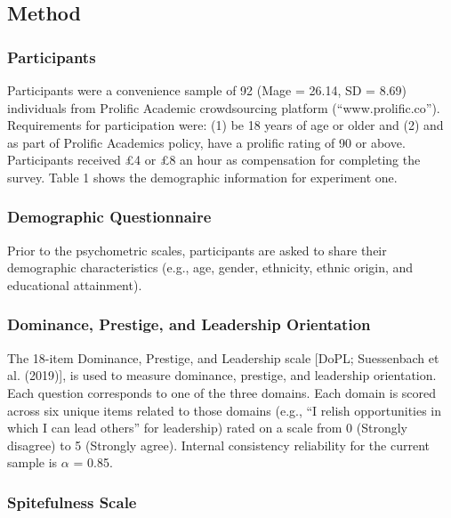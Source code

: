 \documentclass[
  english,
  a4paper,floatsintext]{apa7}
\begin{document}
\hypertarget{method}{%
\subsection{Method}\label{method}}

\hypertarget{participants}{%
\subsubsection{Participants}\label{participants}}

Participants were a convenience sample of 92 (Mage = 26.14, SD = 8.69) individuals from Prolific Academic crowdsourcing platform (``www.prolific.co''). Requirements for participation were: (1) be 18 years of age or older and (2) and as part of Prolific Academics policy, have a prolific rating of 90 or above. Participants received £4 or £8 an hour as compensation for completing the survey. Table 1 shows the demographic information for experiment one.

\hypertarget{demographic-questionnaire}{%
\subsubsection{Demographic Questionnaire}\label{demographic-questionnaire}}

Prior to the psychometric scales, participants are asked to share their demographic characteristics (e.g., age, gender, ethnicity, ethnic origin, and educational attainment).

\hypertarget{dominance-prestige-and-leadership-orientation}{%
\subsubsection{Dominance, Prestige, and Leadership Orientation}\label{dominance-prestige-and-leadership-orientation}}

The 18-item Dominance, Prestige, and Leadership scale {[}DoPL; Suessenbach et al. (2019){]}, is used to measure dominance, prestige, and leadership orientation. Each question corresponds to one of the three domains. Each domain is scored across six unique items related to those domains (e.g., ``I relish opportunities in which I can lead others'' for leadership) rated on a scale from 0 (Strongly disagree) to 5 (Strongly agree). Internal consistency reliability for the current sample is \(\alpha\) = 0.85.

\hypertarget{spitefulness-scale}{%
\subsubsection{Spitefulness Scale}\label{spitefulness-scale}}
\end{document}
